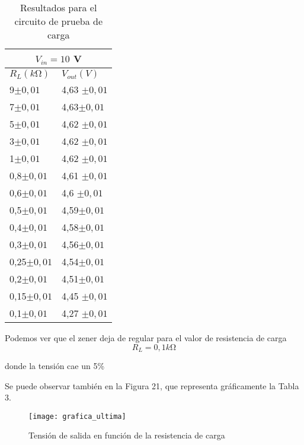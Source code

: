 \documentclass[a4paper,12pt,spanish]{article}
\begin{document}
\begin{table}[H]
	\centering
	\begin{tabular}{|ll|}
		\hline
		\multicolumn{2}{|c|}{$V_{in} = 10$ V}         \\ \hline
		\multicolumn{1}{|l|}{$R_L (\si{k\ohm})$} & $V_{out} (\si{V})$ \\ \hline
		\multicolumn{1}{|l|}{9$\pm 0,01$}           & 4,63 $\pm 0,01$  \\ \hline
		\multicolumn{1}{|l|}{7$\pm 0,01$}           & 4,63$\pm 0,01$   \\ \hline
		\multicolumn{1}{|l|}{5$\pm 0,01$}           & 4,62 $\pm 0,01$  \\ \hline
		\multicolumn{1}{|l|}{3$\pm 0,01$}           & 4,62 $\pm 0,01$  \\ \hline
		\multicolumn{1}{|l|}{1$\pm 0,01$}           & 4,62 $\pm 0,01$  \\ \hline
		\multicolumn{1}{|l|}{0,8$\pm 0,01$}         & 4,61 $\pm 0,01$  \\ \hline
		\multicolumn{1}{|l|}{0,6$\pm 0,01$}         & 4,6 $\pm 0,01$   \\ \hline
		\multicolumn{1}{|l|}{0,5$\pm 0,01$}         & 4,59$\pm 0,01$   \\ \hline
		\multicolumn{1}{|l|}{0,4$\pm 0,01$}         & 4,58$\pm 0,01$   \\ \hline
		\multicolumn{1}{|l|}{0,3$\pm 0,01$}         & 4,56$\pm 0,01$   \\ \hline
		\multicolumn{1}{|l|}{0,25$\pm 0,01$}        & 4,54$\pm 0,01$   \\ \hline
		\multicolumn{1}{|l|}{0,2$\pm 0,01$}         & 4,51$\pm 0,01$   \\ \hline
		\multicolumn{1}{|l|}{0,15$\pm 0,01$}        & 4,45 $\pm 0,01$  \\ \hline
		\multicolumn{1}{|l|}{0,1$\pm 0,01$}         & 4,27 $\pm 0,01$  \\ \hline
	\end{tabular}
	\caption{Resultados para el circuito de prueba de carga}
	\label{tab:my-table}
\end{table}

Podemos ver que el zener deja de regular para el valor de resistencia de carga 
\[R_L = 0,1 \si{k\ohm}\]

donde la tensión cae un 5\%

Se puede observar también en la Figura 21, que representa gráficamente la Tabla 3.

\begin{figure}[H]
	\centering
	\texttt{[image: grafica\_ultima]}
	\caption{Tensión de salida en función de la resistencia de carga}
	\label{fig:graficaultima}
\end{figure}
\end{document}
